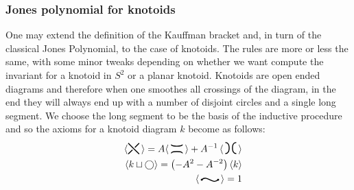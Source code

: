 \subsubsection{\label{sec:theory:jones:jonesknotoids}Jones polynomial for knotoids}
One may extend the definition of the Kauffman bracket and, in turn of the classical Jones Polynomial, to the case of knotoids. The rules are more or less the same, with some minor tweaks depending on whether we want compute the invariant for a knotoid in $S^2$ or a planar knotoid. Knotoids are open ended diagrams and therefore when one smoothes all crossings of the diagram, in the end they will always end up with a number of disjoint circles and a single long segment. We choose the long segment to be the basis of the inductive procedure and so the axioms for a knotoid diagram $k$ become as follows:
\begin{eqnarray}
&&\langle \raisebox{-.1cm}{\begin{tikzpicture}[scale=.2]
\draw [line width=0.35mm]  (-1,-1)-- (-0.22,-0.22);
\draw  [line width=0.35mm ](-1,1)--(0,0);
\draw  [line width=0.35mm] (0.22,0.22) -- (1,1);
\draw [line width=0.35mm]   (0,0) -- +(1,-1);
\end{tikzpicture}}\, \rangle =A \langle \, \raisebox{-.07cm}{\begin{tikzpicture}[scale=.2]
\draw [line width=0.35mm] plot [smooth, tension=2] coordinates { (-1,.8) (0, 0.5) (1,.8)};
\draw [ line width=0.35mm] plot [smooth, tension=2] coordinates { (-1,-.8) (0, -0.5) (1,-.8)};
\end{tikzpicture}}\, \rangle   + A^{-1} \,\langle\, \raisebox{-.1cm}{\begin{tikzpicture}[scale=.2]
 \draw [ line width=0.35mm] plot [smooth, tension=2] coordinates { (-1,-1) (-0.3, 0) (-1,1)};
 \draw [ line width=0.35mm] plot [smooth, tension=2] coordinates { (1,-1) (0.3, 0) (1,1)};
 \end{tikzpicture}}\, \rangle  \\
&&\langle k \sqcup \bigcirc \rangle = \left (-A^2 - A^{-2}\right ) \langle k \rangle\\
&&  \langle \, \raisebox{.07cm}{\begin{tikzpicture}[scale=.1, baseline]
\draw[line width=0.35mm] 
  (1,0) 
    .. controls (3,2) and (5,-2) .. 
  (7,0);  
\draw[black,fill=black] (1,0) circle (2ex);
\draw[black,fill=black] (7,0) circle (2ex);
\end{tikzpicture}}\, \rangle  = 1 \label{regbracket3}
\end{eqnarray}

